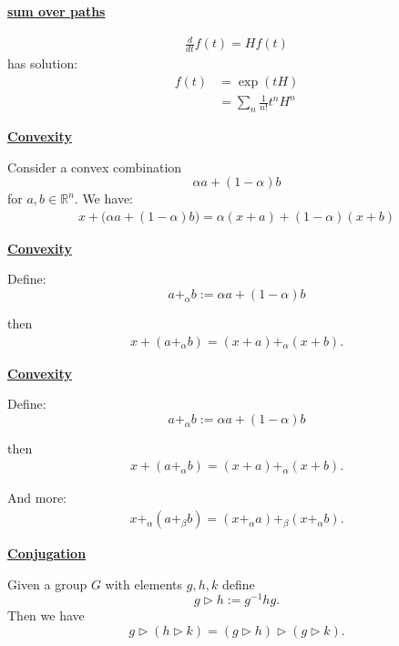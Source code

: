 \documentclass[11pt]{article}
\def\heading #1{\centerline{\underline{\bf\LARGE #1}}}
\def\vsp {\vskip 0.5cm}
\def\R{\mathbb R}
\def\tr{\triangleright}
\begin{document}
\heading{sum over paths}

\begin{align*}
\frac{d}{dt} f(t) = H f(t)
\end{align*}
has solution:
\begin{align*}
f(t) &= \exp(tH) \\
  &= \sum_{n} \frac{1}{n!} t^n H^n
\end{align*}

\newpage %

\heading{Convexity}
\vsp

Consider a convex combination 
$$ \alpha a + (1-\alpha) b$$ 
for $a,b\in\R^n.$
We have:
\begin{align*}
    x + \bigl( \alpha a + (1-\alpha) b \bigr) = \alpha (x + a) + (1-\alpha) (x + b)
\end{align*}

\newpage %

\heading{Convexity}
\vsp

Define:
$$
    a+_\alpha b := \alpha a + (1-\alpha) b
$$

then
\begin{align*}
    x + ( a +_\alpha b ) = (x+a) +_\alpha (x+b).
\end{align*}

\newpage %

\heading{Convexity}
\vsp

Define:
$$
    a+_\alpha b := \alpha a + (1-\alpha) b
$$

then
\begin{align*}
    x + ( a +_\alpha b ) = (x+a) +_\alpha (x+b).
\end{align*}

And more:
\begin{align*}
    x +_\alpha ( a +_\beta b ) = (x+_\alpha a) +_\beta (x+_\alpha b).
\end{align*}


\newpage %

\heading{Conjugation}
\vsp

Given a group $G$
with elements $g, h, k$
define 
$$g\tr h := g^{-1} h g.$$
Then we have
$$
g \triangleright (h \triangleright k) = (g\triangleright h)\triangleright(g\triangleright k).
$$

\newpage %
\end{document}
